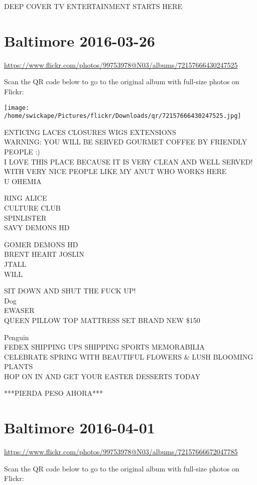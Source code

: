 \documentclass[10pt,letterpaper]{article}
\begin{document}
DEEP COVER TV ENTERTAINMENT STARTS HERE


\section*{Baltimore 2016-03-26}

\url{https://www.flickr.com/photos/99753978@N03/albums/72157666430247525}

Scan the QR code below to go to the original album with full-size photos on Flickr:

\texttt{[image: /home/swickape/Pictures/flickr/Downloads/qr/72157666430247525.jpg]}


ENTICING LACES CLOSURES WIGS EXTENSIONS\\
WARNING: YOU WILL BE SERVED GOURMET COFFEE BY FRIENDLY PEOPLE :)\\
I LOVE THIS PLACE BECAUSE IT IS VERY CLEAN AND WELL SERVED!  WITH VERY NICE PEOPLE LIKE MY ANUT WHO WORKS HERE\\
U OHEMIA

RING ALICE\\
CULTURE CLUB\\
SPINLISTER\\
SAVY DEMONS HD

GOMER DEMONS HD\\
BRENT HEART JOSLIN\\
JTALL\\
WILL

SIT DOWN AND SHUT THE FUCK UP!\\
Dog\\
EWASER\\
QUEEN PILLOW TOP MATTRESS SET BRAND NEW \$150

Penguin\\
FEDEX SHIPPING UPS SHIPPING SPORTS MEMORABILIA\\
CELEBRATE SPRING WITH BEAUTIFUL FLOWERS \& LUSH BLOOMING PLANTS\\
HOP ON IN AND GET YOUR EASTER DESSERTS TODAY

***PIERDA PESO AHORA***


\section*{Baltimore 2016-04-01}

\url{https://www.flickr.com/photos/99753978@N03/albums/72157666672047785}

Scan the QR code below to go to the original album with full-size photos on Flickr:
\end{document}

